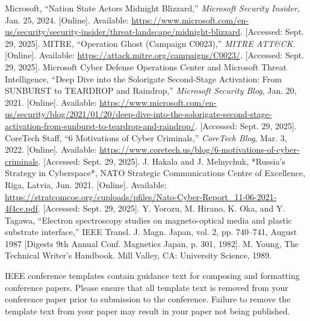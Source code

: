 \documentclass[conference]{IEEEtran}
\begin{document}
\begin{thebibliography}{00}
 Microsoft, ``Nation State Actors Midnight Blizzard,'' \emph{Microsoft Security Insider}, Jan. 25, 2024. [Online]. Available: \url{https://www.microsoft.com/en-us/security/security-insider/threat-landscape/midnight-blizzard}. [Accessed: Sept. 29, 2025].
 MITRE, ``Operation Ghost (Campaign C0023),'' \emph{MITRE ATT\&CK}. [Online]. Available: \url{https://attack.mitre.org/campaigns/C0023/}. [Accessed: Sept. 29, 2025].
 Microsoft Cyber Defense Operations Center and Microsoft Threat Intelligence, ``Deep Dive into the Solorigate Second-Stage Activation: From SUNBURST to TEARDROP and Raindrop,'' \emph{Microsoft Security Blog}, Jan. 20, 2021. [Online]. Available: \url{https://www.microsoft.com/en-us/security/blog/2021/01/20/deep-dive-into-the-solorigate-second-stage-activation-from-sunburst-to-teardrop-and-raindrop/}. [Accessed: Sept. 29, 2025].
 CoreTech Staff, ``6 Motivations of Cyber Criminals,'' \emph{CoreTech Blog}, Mar. 3, 2022. [Online]. Available: \url{https://www.coretech.us/blog/6-motivations-of-cyber-criminals}. [Accessed: Sept. 29, 2025].
 J. Hakala and J. Melnychuk, *Russia’s Strategy in Cyberspace*, NATO Strategic Communications Centre of Excellence, Riga, Latvia, Jun. 2021. [Online]. Available: \url{https://stratcomcoe.org/cuploads/pfiles/Nato-Cyber-Report_11-06-2021-4f4ce.pdf}. [Accessed: Sept. 29, 2025].
 Y. Yorozu, M. Hirano, K. Oka, and Y. Tagawa, ``Electron spectroscopy studies on magneto-optical media and plastic substrate interface,'' IEEE Transl. J. Magn. Japan, vol. 2, pp. 740--741, August 1987 [Digests 9th Annual Conf. Magnetics Japan, p. 301, 1982].
 M. Young, The Technical Writer's Handbook. Mill Valley, CA: University Science, 1989.
\end{thebibliography}
\vspace{12pt}
\color{red}
IEEE conference templates contain guidance text for composing and formatting conference papers. Please ensure that all template text is removed from your conference paper prior to submission to the conference. Failure to remove the template text from your paper may result in your paper not being published.
\end{document}
